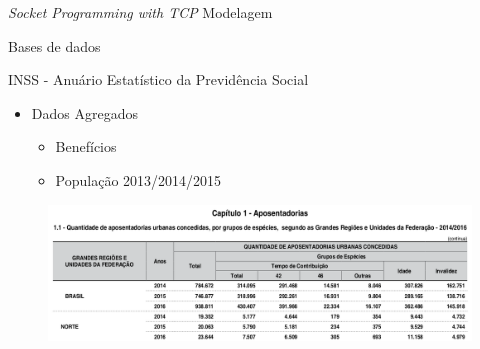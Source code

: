 \begin{frame}{\textit{Socket Programming with TCP}}
  Modelagem
\end{frame}

\begin{frame}{Bases de dados}
  \begin{block}{INSS - Anuário Estatístico da Previdência Social}
    \begin{itemize}
      \item Dados Agregados
      \begin{itemize}
        \item Benefícios
        \item População 2013/2014/2015
      \end{itemize}
    \end{itemize}
  \end{block}
  \begin{figure}[h]
  	\begin{center}
      \includegraphics [scale=0.27]{./Figures/aeps01}
  	\end{center}
  \end{figure}
\end{frame}

